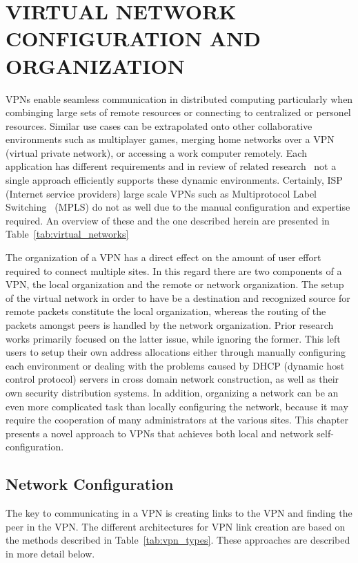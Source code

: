 \chapter{VIRTUAL NETWORK CONFIGURATION AND ORGANIZATION}
\label{chap:vpns}

VPNs enable seamless communication in distributed computing particularly when
combinging large sets of remote resources or connecting to centralized or
personel resources.  Similar use cases can be extrapolated onto other
collaborative environments such as multiplayer games, merging home networks
over a VPN (virtual private network), or accessing a work computer remotely.
Each application has different requirements and in review of related
research~\cite{ipop, vine, violin, vnet, ocala, softudc, openvpn, hamachi,
wippien, gbridge, pvc, tinc, n2n, p2pvpn, l2tp} not a single approach
efficiently supports these dynamic environments.  Certainly, ISP (Internet
service providers) large scale VPNs such as Multiprotocol Label
Switching~\cite{mpls} (MPLS) do not as well due to the manual configuration and
expertise required.  An overview of these and the one described herein are
presented in Table~\ref{tab:virtual_networks}

The organization of a VPN has a direct effect on the amount of user effort
required to connect multiple sites.  In this regard there are two components of
a VPN, the local organization and the remote or network organization.  The
setup of the virtual network in order to have be a destination and recognized
source for remote packets constitute the local organization, whereas the
routing of the packets amongst peers is handled by the network organization.
Prior research works primarily focused on the latter issue, while ignoring the
former.  This left users to setup their own address allocations either through
manually configuring each environment or dealing with the problems caused by
DHCP (dynamic host control protocol) servers in cross domain network
construction, as well as their own security distribution systems.  In addition,
organizing a network can be an even more complicated task than locally
configuring the network, because it may require the cooperation of many
administrators at the various sites.  This chapter presents a novel approach to
VPNs that achieves both local and network self-configuration.

\section{Network Configuration} The key to communicating in a VPN is creating
links to the VPN and finding the peer in the VPN.  The different architectures
for VPN link creation are based on the methods described in
Table~\ref{tab:vpn_types}.  These approaches are described in more detail
below.

